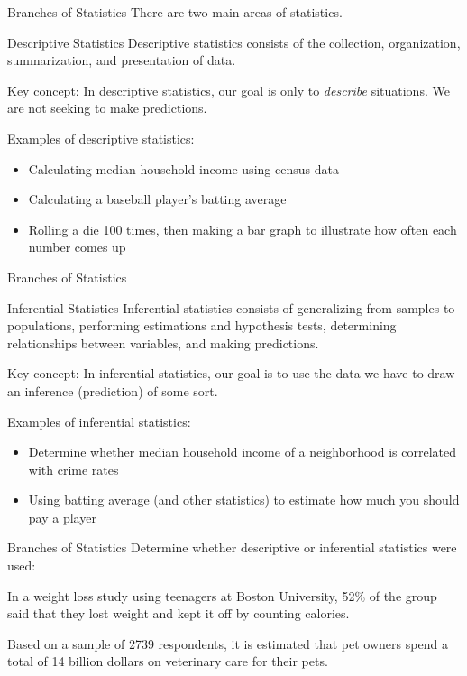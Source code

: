 \documentclass[t]{beamer}
\newcommand{\?}{\stackrel{?}{=}}
\begin{document}
	\begin{frame}{Branches of Statistics}
		There are two main areas of statistics. \pause
		
		\begin{block}{Descriptive Statistics}
			Descriptive statistics consists of the collection, organization, summarization, and presentation of data.
		\end{block} \pause
	
		Key concept: In descriptive statistics, our goal is only to \textit{describe} situations. We are not seeking to make predictions. \pause
		
		Examples of descriptive statistics: \pause \begin{itemize}
			\item Calculating median household income using census data
			\item Calculating a baseball player's batting average
			\item Rolling a die 100 times, then making a bar graph to illustrate how often each number comes up
		\end{itemize}
	\end{frame}

	\begin{frame}{Branches of Statistics}
		\begin{block}{Inferential Statistics}
			Inferential statistics consists of generalizing from samples to populations, performing estimations and hypothesis tests, determining relationships between variables, and making predictions.
		\end{block} \pause
		
		Key concept: In inferential statistics, our goal is to use the data we have to draw an inference (prediction) of some sort. \pause
		
		Examples of inferential statistics: \pause \begin{itemize}
			\item Determine whether median household income of a neighborhood is correlated with crime rates
			\item Using batting average (and other statistics) to estimate how much you should pay a player
		\end{itemize}
	\end{frame}

	\begin{frame}{Branches of Statistics}
		Determine whether descriptive or inferential statistics were used:
		
		In a weight loss study using teenagers at Boston University, 52\% of the group said that they lost weight and kept it off by counting calories.
		
		
		Based on a sample of 2739 respondents, it is estimated that pet owners spend a total of 14 billion dollars on veterinary care for their pets.
		
	\end{frame}
\end{document}
